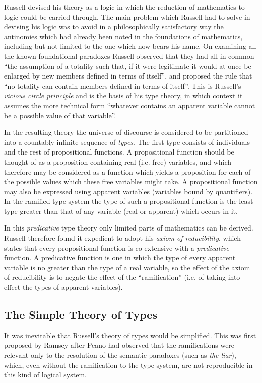 \documentclass[10pt,titlepage]{book}
\begin{document}
Russell devised his theory as a logic in which the reduction of mathematics to logic could be carried through.
The main problem which Russell had to solve in devising his logic was to avoid in a philosophically satisfactory way the antinomies which had already been noted in the foundations of mathematics, including but not limited to the one which now bears his name.
On examining all the known foundational paradoxes Russell observed that they had all in common ``the assumption of a totality such that, if it were legitimate it would at once be enlarged by new members defined in terms of itself'', and proposed the rule that ``no totality can contain members defined in terms of itself''.
This is Russell's {\it vicious circle principle} and is the basis of his type theory, in which context it assumes the more technical form ``whatever contains an apparent variable cannot be a possible value of that variable''.

In the resulting theory the universe of discourse is considered to be partitioned into a countably infinite sequence of {\it types}.
The first type consists of individuals and the rest of propositional functions.
A propositional function should be thought of as a proposition containing real (i.e. free) variables, and which therefore may be considered as a function which yields a proposition for each of the possible values which these free variables might take.
A propositional function may also be expressed using apparent variables (variables bound by quantifiers).
In the ramified type system the type of such a propositional function is the least type greater than that of any variable (real or apparent) which occurs in it.

In this {\it predicative} type theory only limited parts of mathematics can be derived.
Russell therefore found it expedient to adopt his {\it axiom of reducibility}, which states that every propositional function is co-extensive with a {\it predicative} function.
A predicative function is one in which the type of every apparent variable is no greater than the type of a real variable, so the effect of the axiom of reducibility is to negate the effect of the ``ramification'' (i.e. of taking into effect the types of apparent variables).

\subsection{The Simple Theory of Types}

It was inevitable that Russell's theory of types would be simplified.
This was first proposed by Ramsey \cite{ramsey31} after Peano had observed that the ramifications were relevant only to the resolution of the semantic paradoxes (such as {\it the liar}), which, even
without the ramification to the type system, are not reproducible in this kind of logical system.
\end{document}
